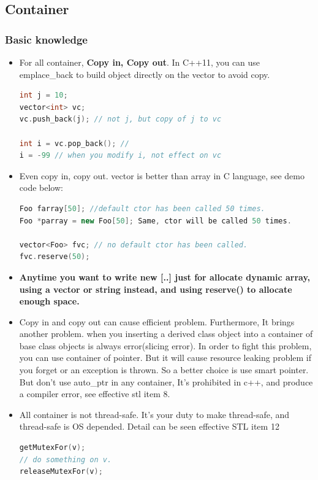 \documentclass[a4paper,12pt,twoside]{book}
\begin{document}
\subsection{Container}

\subsubsection{Basic knowledge}
\begin{itemize}

\item For all container, \textbf{Copy in, Copy out}. In C++11, you can use emplace\_back to build object directly on the vector to avoid copy.
\begin{lstlisting}[frame=single, language=c++]
int j = 10;
vector<int> vc;
vc.push_back(j); // not j, but copy of j to vc

int i = vc.pop_back(); //
i = -99 // when you modify i, not effect on vc
\end{lstlisting}

\item Even copy in, copy out. vector is better than array in C language, see demo code below:
\begin{lstlisting}[frame=single, language=c++]
Foo farray[50]; //default ctor has been called 50 times.
Foo *parray = new Foo[50]; Same, ctor will be called 50 times.

vector<Foo> fvc; // no default ctor has been called.
fvc.reserve(50);
\end{lstlisting}

\item \textbf{Anytime you want to write new [..] just for allocate dynamic array, using a vector or string instead, and using reserve() to allocate enough space.}


\item Copy in and copy out can cause efficient problem. Furthermore, It brings  another problem. when you inserting a derived class object into a container of base class objects is always error(slicing error). In order to fight this problem, you can use container of pointer. But it will cause resource leaking problem if you forget or an exception is thrown. So a better choice is use smart pointer. But don't use auto\_ptr in any container, It's prohibited in c++, and produce a compiler error, see effective stl item 8.

\item All container is not thread-safe. It's your duty to make thread-safe, and thread-safe is OS depended. Detail can be seen effective STL item 12
\begin{lstlisting}[frame=single, language=c++]
getMutexFor(v);
// do something on v.
releaseMutexFor(v);
\end{lstlisting}


\end{itemize}
\end{document}
